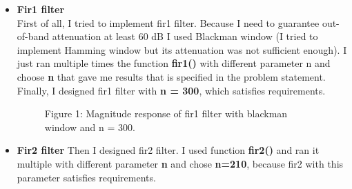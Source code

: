 \documentclass[16pt]{report}
\begin{document}
\begin{itemize}
\item\textbf{Fir1 filter} \\
First of all, I tried to implement fir1 filter. Because I need to guarantee out-of-band attenuation at least 60 dB I used Blackman window (I tried to implement Hamming window but its attenuation was not sufficient enough). I just ran multiple times the function \textbf{fir1()} with different parameter n and choose \textbf{n} that gave me results that is specified in the problem statement. Finally, I designed fir1 filter with \textbf{n = 300}, which satisfies requirements.
\begin{figure}[h!]
    \caption{Figure 1: Magnitude response of fir1 filter with blackman window and n = 300.}
    \label{fig:my_label}
\end{figure}
\item\textbf{Fir2 filter}
Then I designed fir2 filter. I used function \textbf{fir2()} and ran it multiple with different parameter \textbf{n} and chose \textbf{n=210}, because fir2 with this parameter satisfies requirements.
\begin{figure}[h!]

\end{figure}
\end{itemize}
\end{document}
